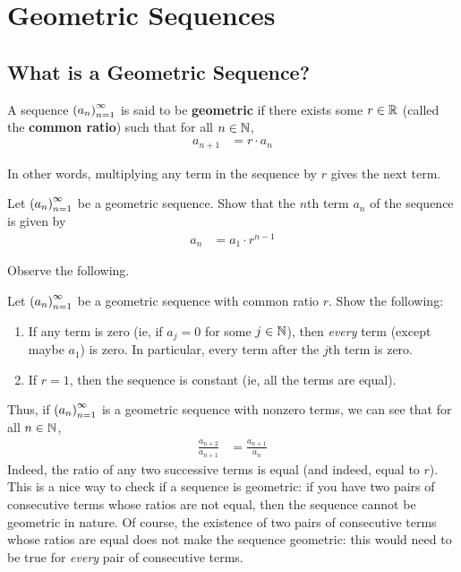 \section{Geometric Sequences}

\subsection{What is a Geometric Sequence?}

\begin{definition}
    A sequence $\left( a_n \right)_{n=1}^{\infty}$ is said to be \textbf{geometric} if there exists some $r \in \mathbb{R}$ (called the \textbf{common ratio}) such that for all $n \in \mathbb{N}$,
    \begin{align}
        a_{n+1} &= r \cdot a_n
    \end{align}
\end{definition}
In other words, multiplying any term in the sequence by $r$ gives the next term.

\begin{boxexercise}
    Let $\left( a_n \right)_{n=1}^{\infty}$ be a geometric sequence. Show that the $n$th term $a_n$ of the sequence is given by
    \begin{align}
        a_n &= a_1 \cdot r^{n - 1}
    \end{align}
\end{boxexercise}

Observe the following.
\begin{boxhexercise} Let $\left( a_n \right)_{n=1}^{\infty}$ be a geometric sequence with common ratio $r$. Show the following:
\begin{enumerate}
    \item If any term is zero (ie, if $a_j = 0$ for some $j \in \mathbb{N}$), then \textit{every} term (except maybe $a_1$) is zero. In particular, every term after the $j$th term is zero.
    \item If $r = 1$, then the sequence is constant (ie, all the terms are equal).
\end{enumerate}
\end{boxhexercise}

Thus, if $\left( a_n \right)_{n=1}^{\infty}$ is a geometric sequence with nonzero terms, we can see that for all $n \in \mathbb{N}$,
\begin{align}
    \frac{a_{n+2}}{a_{n+1}} &= \frac{a_{n+1}}{a_n}
\end{align}
Indeed, the ratio of any two successive terms is equal (and indeed, equal to $r$). This is a nice way to check if a sequence is geometric: if you have two pairs of consecutive terms whose ratios are not equal, then the sequence cannot be geometric in nature. Of course, the existence of two pairs of consecutive terms whose ratios are equal does not make the sequence geometric: this would need to be true for \textit{every} pair of consecutive terms.

